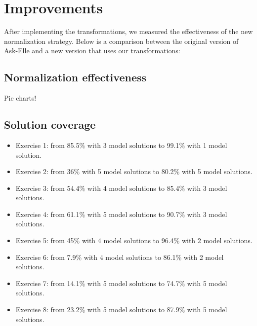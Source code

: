 \chapter{Improvements}
\label{sec:improvements}

After implementing the transformations, we measured the effectiveness of the new normalization strategy. Below is a comparison between the original version of Ask-Elle and a new version that uses our transformations:

\section{Normalization effectiveness}

Pie charts!

\section{Solution coverage}

\begin{itemize}
    \item Exercise 1: from 85.5\% with 3 model solutions to 99.1\% with 1 model solution.
    \item Exercise 2: from 36\% with 5 model solutions to 80.2\% with 5 model solutions.
    \item Exercise 3: from 54.4\% with 4 model solutions to 85.4\% with 3 model solutions.
    \item Exercise 4: from 61.1\% with 5 model solutions to 90.7\% with 3 model solutions.
    \item Exercise 5: from 45\% with 4 model solutions to 96.4\% with 2 model solutions.
    \item Exercise 6: from 7.9\% with 4 model solutions to 86.1\% with 2 model solutions.
    \item Exercise 7: from 14.1\% with 5 model solutions to 74.7\% with 5 model solutions.
    \item Exercise 8: from 23.2\% with 5 model solutions to 87.9\% with 5 model solutions.
\end{itemize}

